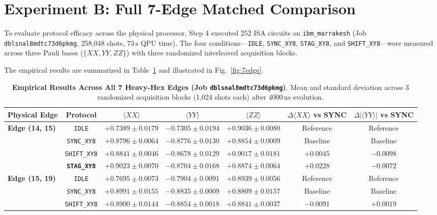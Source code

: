 \documentclass[twocolumn,aps,pra,superscriptaddress,showpacs,floatfix]{revtex4-2}
\begin{document}
\section{Experiment B: Full 7-Edge Matched Comparison}

To evaluate protocol efficacy across the physical processor, Step 4 executed 252 ISA circuits on \texttt{ibm\_marrakesh} (Job \texttt{dblsnal8mdtc73d6pkmg}, 258,048 shots, $73\,\mathrm{s}$ QPU time). The four conditions—\texttt{IDLE}, \texttt{SYNC\_XY8}, \texttt{STAG\_XY8}, and \texttt{SHIFT\_XY8}—were measured across three Pauli bases ($\{XX, YY, ZZ\}$) with three randomized interleaved acquisition blocks.

The empirical results are summarized in Table~\ref{tab:7edge} and illustrated in Fig.~\ref{fig:7edge}.

\begin{table}[t]
\centering
\caption{\textbf{Empirical Results Across All 7 Heavy-Hex Edges (Job \texttt{dblsnal8mdtc73d6pkmg})}. Mean and standard deviation across 3 randomized acquisition blocks (1,024 shots each) after $4000\,\mathrm{ns}$ evolution.}
\label{tab:7edge}
\begin{tabular}{lcccccc}
\toprule
Physical Edge & Protocol & $\langle XX \rangle$ & $\langle YY \rangle$ & $\langle ZZ \rangle$ & $\Delta \langle XX \rangle$ vs SYNC & $\Delta |\langle YY \rangle|$ vs SYNC \\
\midrule
\textbf{Edge (14, 15)} & \texttt{IDLE} & $+0.7389 \pm 0.0179$ & $-0.7305 \pm 0.0194$ & $+0.9036 \pm 0.0080$ & Reference & Reference \\
& \texttt{SYNC\_XY8} & $+0.8796 \pm 0.0064$ & $-0.8776 \pm 0.0130$ & $+0.8854 \pm 0.0009$ & Baseline & Baseline \\
& \texttt{SHIFT\_XY8} & $+0.8841 \pm 0.0046$ & $-0.8678 \pm 0.0129$ & $+0.9017 \pm 0.0181$ & $+0.0045$ & $-0.0098$ \\
& \textbf{\texttt{STAG\_XY8}} & $\mathbf{+0.9023 \pm 0.0070}$ & $-0.8704 \pm 0.0168$ & $+0.8874 \pm 0.0064$ & $\mathbf{+0.0228}$ & $-0.0072$ \\
\midrule
\textbf{Edge (15, 19)} & \texttt{IDLE} & $+0.7695 \pm 0.0073$ & $-0.7904 \pm 0.0091$ & $+0.8939 \pm 0.0056$ & Reference & Reference \\
& \texttt{SYNC\_XY8} & $+0.8991 \pm 0.0155$ & $\mathbf{-0.8835 \pm 0.0009}$ & $+0.8809 \pm 0.0157$ & Baseline & Baseline \\
& \texttt{SHIFT\_XY8} & $+0.8900 \pm 0.0144$ & $-0.8854 \pm 0.0018$ & $+0.8841 \pm 0.0037$ & $-0.0091$ & $+0.0019$ \\

\end{tabular}
\end{table}
\end{document}
